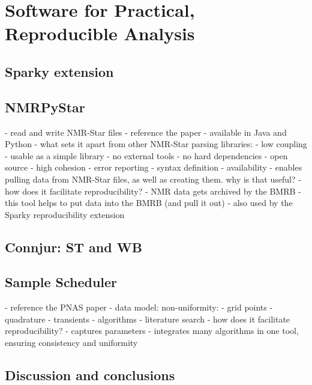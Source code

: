 \chapter{Software for Practical, Reproducible Analysis}

\section{Sparky extension}

\section{NMRPyStar}
 - read and write NMR-Star files
 - reference the paper
 - available in Java and Python
 - what sets it apart from other NMR-Star parsing libraries:
   - low coupling
     - usable as a simple library
     - no external tools
     - no hard dependencies
   - open source
   - high cohesion
   - error reporting
   - syntax definition
 - availability
 - enables pulling data from NMR-Star files, as well as creating them.
   why is that useful?
 - how does it facilitate reproducibility?
   - NMR data gets archived by the BMRB
   - this tool helps to put data into the BMRB (and pull it out)
   - also used by the Sparky reproducibility extension

\section{Connjur: ST and WB}

\section{Sample Scheduler}
 - reference the PNAS paper
 - data model: non-uniformity:
   - grid points
   - quadrature
   - transients
 - algorithms
   - literature search
 - how does it facilitate reproducibility?
   - captures parameters
   - integrates many algorithms in one tool, ensuring consistency
     and uniformity

\section{Discussion and conclusions}

